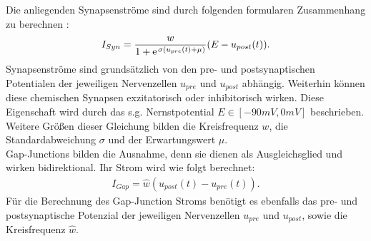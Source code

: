 	Die anliegenden Synapsenströme sind durch folgenden formularen Zusammenhang zu berechnen \cite{WormLevelRL}:
	\begin{align}
		\label{eq:chem_syn_current}
		I_{Syn} = \frac{w}{1 + \e^{\sigma(u_{pre}(t) + \mu)}}(E - u_{post}(t))\text{.}
	\end{align}
	Synapsenströme sind grundsätzlich von den pre- und postsynaptischen Potentialen der jeweiligen Nervenzellen $u_{pre}$ und $u_{post}$ abhängig. Weiterhin können diese chemischen Synapsen exzitatorisch oder inhibitorisch wirken. Diese Eigenschaft wird durch das s.g. Nernstpotential $E\in[-90mV, 0mV]$ beschrieben. Weitere Größen dieser Gleichung bilden die Kreisfrequenz $w$, die Standardabweichung $\sigma$ und der Erwartungswert $\mu$.\\
	Gap-Junctions bilden die Ausnahme, denn sie dienen als Ausgleichsglied und wirken bidirektional. Ihr Strom wird wie folgt berechnet:
	\begin{align}
		\label{eq:gap_syn_current}
		I_{Gap} = \hat{w}(u_{post}(t) - u_{pre}(t))\text{.}
	\end{align}
	Für die Berechnung des Gap-Junction Stroms benötigt es ebenfalls das pre- und postsynaptische Potenzial der jeweiligen Nervenzellen $u_{pre}$ und $u_{post}$, sowie die Kreisfrequenz $\hat{w}$.
	
